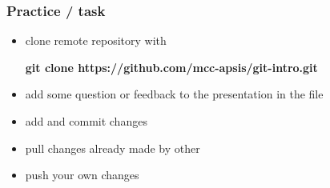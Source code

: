 \documentclass{beamer}
\newcommand{\code}[1]{{\fontfamily{pcr}\selectfont \textbf{#1}}}
\begin{document}
\begin{frame}
\frametitle{Practice / task}

\begin{itemize}
\item clone remote repository with

\code{git clone https://github.com/mcc-apsis/git-intro.git}

\item add some question or feedback to the presentation in the file

\item add and commit changes

\item pull changes already made by other

\item push your own changes
\end{itemize}




\end{frame}
\end{document}
